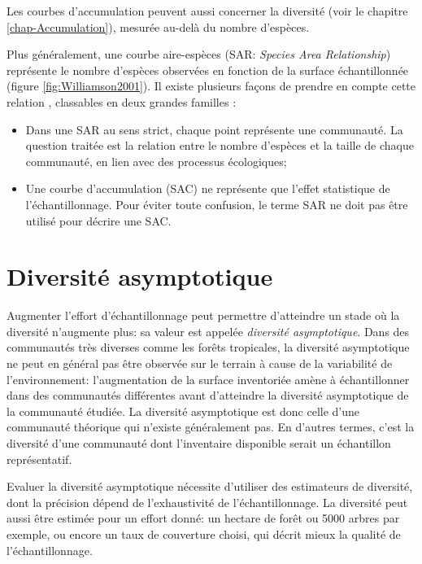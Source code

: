 \documentclass[
  11pt,
  american,
  a4paper,
  extrafontsizes,onecolumn,openright
  ]{memoir}
\providecommand{\tightlist}{%
  \setlength{\itemsep}{0pt}\setlength{\parskip}{0pt}}
\newlength{\rf}
\begin{document}
\normalsize

Les courbes d'accumulation peuvent aussi concerner la diversité (voir le chapitre \ref{chap-Accumulation}), mesurée au-delà du nombre d'espèces.

Plus généralement, une courbe aire-espèces (SAR: \emph{Species Area Relationship}) représente le nombre d'espèces observées en fonction de la surface échantillonnée (figure \ref{fig:Williamson2001}).
Il existe plusieurs façons de prendre en compte cette relation \autocite{Scheiner2003}, classables en deux grandes familles \autocite{Dengler2009}:

\begin{itemize}
\tightlist
\item
  Dans une SAR au sens strict, chaque point représente une communauté.
  La question traitée est la relation entre le nombre d'espèces et la taille de chaque communauté, en lien avec des processus écologiques;
\item
  Une courbe d'accumulation (SAC) ne représente que l'effet statistique de l'échantillonnage.
  Pour éviter toute confusion, le terme SAR ne doit pas être utilisé pour décrire une SAC.
\end{itemize}

\hypertarget{diversituxe9-asymptotique}{%
\section{Diversité asymptotique}\label{diversituxe9-asymptotique}}

Augmenter l'effort d'échantillonnage peut permettre d'atteindre un stade où la diversité n'augmente plus: sa valeur est appelée \emph{diversité asymptotique}.
Dans des communautés très diverses comme les forêts tropicales, la diversité asymptotique ne peut en général pas être observée sur le terrain à cause de la variabilité de l'environnement: l'augmentation de la surface inventoriée amène à échantillonner dans des communautés différentes avant d'atteindre la diversité asymptotique de la communauté étudiée.
La diversité asymptotique est donc celle d'une communauté théorique qui n'existe généralement pas.
En d'autres termes, c'est la diversité d'une communauté dont l'inventaire disponible serait un échantillon représentatif.

Evaluer la diversité asymptotique nécessite d'utiliser des estimateurs de diversité, dont la précision dépend de l'exhaustivité de l'échantillonnage.
La diversité peut aussi être estimée pour un effort donné: un hectare de forêt ou 5000 arbres par exemple, ou encore un taux de couverture choisi, qui décrit mieux la qualité de l'échantillonnage.
\end{document}
